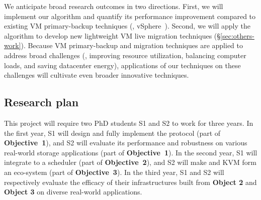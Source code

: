 
 We anticipate broad research outcomes in two 
directions. First, we will implement our algorithm and quantify its performance 
improvement compared to existing VM primary-backup 
techniques (\eg, vSphere~\cite{ftvm}). Second, we will apply the 
algorithm to develop new lightweight VM live migration techniques 
(\S\ref{sec:others-work}). Because VM primary-backup and migration techniques 
are applied to address broad challenges (\eg, improving resource utilization, 
balancing computer loads, and saving datacenter energy), applications of our 
techniques on these challenges will cultivate even broader innovative 
techniques.


% 

\vspace{-.15in}\subsection{Research plan} \label{sec:plan}\vspace{-.075in}

This project will require two PhD students S1 and S2 to work for 
three years. In the first year, S1 will design and fully implement the \falcon 
protocol (part of \textbf{Objective~1}), and S2 will evaluate its performance 
and robustness on various real-world storage applications (part of 
\textbf{Objective~1}). In the second year, S1 will 
integrate \falcon to a scheduler \mesos (part of \textbf{Objective~2}), and S2 
will make \falcon and KVM form an eco-system (part of \textbf{Objective~3}). In 
the third year, S1 and S2 will respectively evaluate the efficacy of their 
infrastructures built from \textbf{Object 2} and \textbf{Object 3} on diverse
real-world applications.


